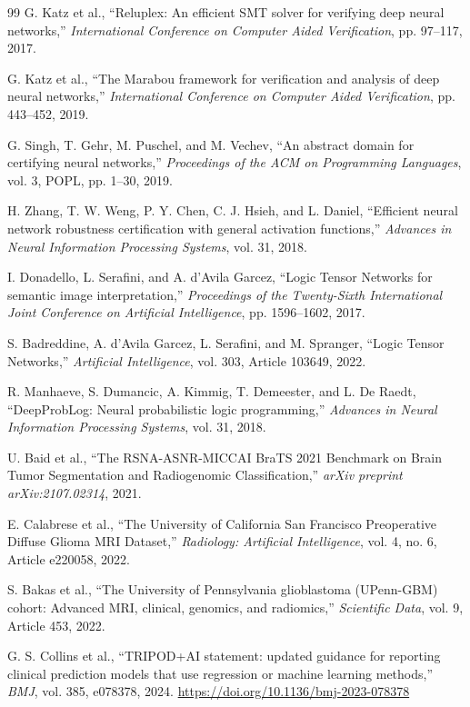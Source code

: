 \documentclass[preprint,11pt]{elsarticle}
\begin{document}
\begin{thebibliography}{99}
G. Katz et al.,
``Reluplex: An efficient SMT solver for verifying deep neural networks,''
\emph{International Conference on Computer Aided Verification}, pp. 97--117, 2017.

G. Katz et al.,
``The Marabou framework for verification and analysis of deep neural networks,''
\emph{International Conference on Computer Aided Verification}, pp. 443--452, 2019.

G. Singh, T. Gehr, M. Puschel, and M. Vechev,
``An abstract domain for certifying neural networks,''
\emph{Proceedings of the ACM on Programming Languages}, vol. 3, POPL, pp. 1--30, 2019.

H. Zhang, T. W. Weng, P. Y. Chen, C. J. Hsieh, and L. Daniel,
``Efficient neural network robustness certification with general activation functions,''
\emph{Advances in Neural Information Processing Systems}, vol. 31, 2018.

I. Donadello, L. Serafini, and A. d'Avila Garcez,
``Logic Tensor Networks for semantic image interpretation,''
\emph{Proceedings of the Twenty-Sixth International Joint Conference on Artificial Intelligence}, pp. 1596--1602, 2017.

S. Badreddine, A. d'Avila Garcez, L. Serafini, and M. Spranger,
``Logic Tensor Networks,''
\emph{Artificial Intelligence}, vol. 303, Article 103649, 2022.

R. Manhaeve, S. Dumancic, A. Kimmig, T. Demeester, and L. De Raedt,
``DeepProbLog: Neural probabilistic logic programming,''
\emph{Advances in Neural Information Processing Systems}, vol. 31, 2018.

U. Baid et al.,
``The RSNA-ASNR-MICCAI BraTS 2021 Benchmark on Brain Tumor Segmentation and Radiogenomic Classification,''
\emph{arXiv preprint arXiv:2107.02314}, 2021.

E. Calabrese et al.,
``The University of California San Francisco Preoperative Diffuse Glioma MRI Dataset,''
\emph{Radiology: Artificial Intelligence}, vol. 4, no. 6, Article e220058, 2022.

S. Bakas et al.,
``The University of Pennsylvania glioblastoma (UPenn-GBM) cohort: Advanced MRI, clinical, genomics, and radiomics,''
\emph{Scientific Data}, vol. 9, Article 453, 2022.

G. S. Collins et al.,
``TRIPOD+AI statement: updated guidance for reporting clinical prediction models that use regression or machine learning methods,''
\emph{BMJ}, vol. 385, e078378, 2024.
\url{https://doi.org/10.1136/bmj-2023-078378}


\end{thebibliography}
\end{document}
